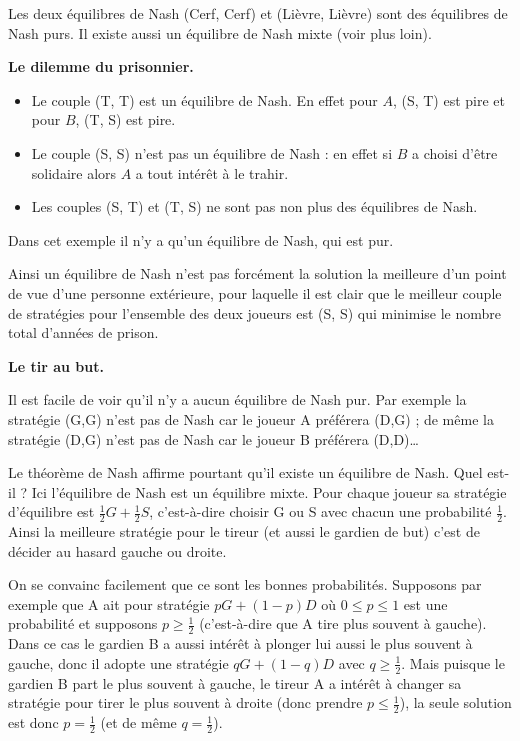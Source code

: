 \documentclass[11pt,class=report,crop=false]{standalone}
\begin{document}
Les deux équilibres de Nash (Cerf, Cerf) et  (Lièvre, Lièvre) sont des équilibres de Nash purs. Il existe aussi un équilibre de Nash mixte (voir plus loin).

\bigskip
\textbf{Le dilemme du prisonnier.}



\begin{itemize}
	\item Le couple (T, T) est un équilibre de Nash. En effet pour $A$, (S, T) est pire et pour $B$, (T, S) est pire.
	\item Le couple (S, S) n'est pas un équilibre de Nash : en effet si $B$ a choisi d'être solidaire alors $A$ a tout intérêt à le trahir.
	\item Les couples (S, T) et (T, S) ne sont pas non plus des équilibres de Nash.
\end{itemize}

Dans cet exemple il n'y a qu'un équilibre de Nash, qui est pur.

Ainsi un équilibre de Nash n'est pas forcément la solution la meilleure d'un point de vue d'une personne extérieure, pour laquelle il est clair que le meilleur couple de stratégies pour l'ensemble des deux joueurs est (S, S) qui minimise le nombre total d'années de prison.


\bigskip
\textbf{Le tir au but.}




Il est facile de voir qu'il n'y a aucun équilibre de Nash pur. Par exemple la stratégie (G,G) n'est pas de Nash car le joueur A préférera (D,G) ; de même la stratégie (D,G) n'est pas de Nash car le joueur B préférera (D,D)\ldots

Le théorème de Nash affirme pourtant qu'il existe un équilibre de Nash. Quel est-il ? 
Ici l'équilibre de Nash est un équilibre mixte. Pour chaque joueur sa stratégie d'équilibre est $\frac12G+ \frac12S$, c'est-à-dire choisir G ou S avec chacun une probabilité $\frac12$. Ainsi la meilleure stratégie pour le tireur (et aussi le gardien de but) c'est de décider au hasard gauche ou droite.

On se convainc facilement que ce sont les bonnes probabilités. Supposons par exemple que A ait pour stratégie $pG + (1-p)D$ où $0 \le p \le 1$ est une probabilité
et supposons $p \ge \frac12$ (c'est-à-dire que A tire plus souvent à gauche). Dans ce cas le gardien B a aussi intérêt à plonger lui aussi le plus souvent à gauche, donc il adopte une stratégie $qG+(1-q)D$ avec $q \ge \frac12$. Mais puisque le gardien B part le plus souvent à gauche, le tireur A a intérêt à changer sa stratégie pour tirer le plus souvent à droite (donc prendre $p \le \frac12$), la seule solution est donc $p = \frac12$ (et de même $q=\frac12$).
\end{document}
